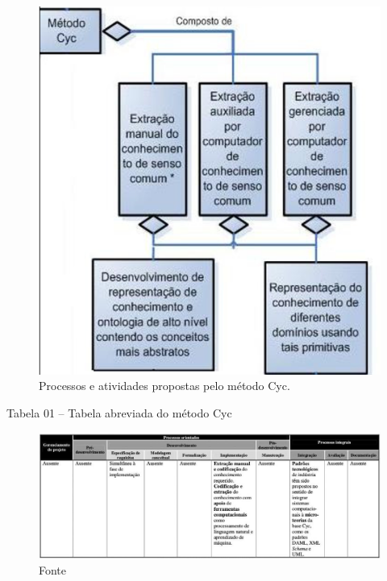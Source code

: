 \begin{figure}[h] 
\centering %
\includegraphics[scale=0.6]{Figuras/1.png} %
\caption[Processos e atividades propostas pelo método Cyc]{Processos e atividades propostas pelo método Cyc. %
}
\end{figure}

\pagebreak

Tabela 01 – Tabela abreviada do método Cyc
                                  
\begin{figure}[h] 
\centering %
\includegraphics[scale=0.3]{Figuras/2.png} %
\caption{Fonte %
}
\end{figure}

